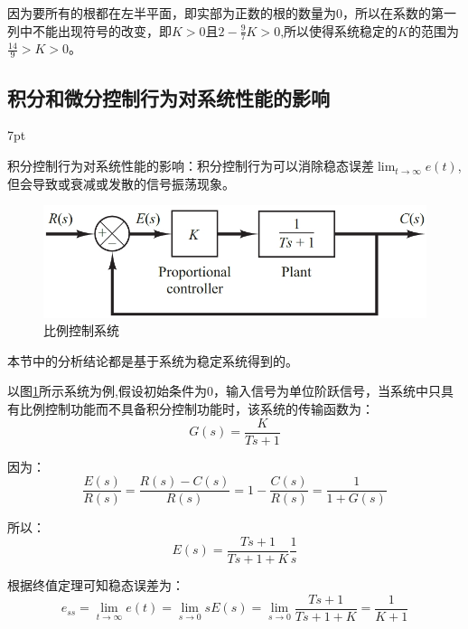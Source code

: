 \documentclass{article}
\numberwithin{equation}{section}
\numberwithin{figure}{section}
\newenvironment{formal}{%
\def\FrameCommand{%
\hspace{1pt}%
{\color{DarkBlue}\vrule width 2pt}%
{\color{formalshade}\vrule width 4pt}%
\colorbox{formalshade}%
}%
\MakeFramed{\advance\hsize-\width\FrameRestore}%
\noindent\hspace{-4.55pt}%
\begin{adjustwidth}{}{7pt}%
\vspace{2pt}\vspace{2pt}%
}
{%
\vspace{2pt}\end{adjustwidth}\endMakeFramed%
}
\begin{document}
因为要所有的根都在左半平面，即实部为正数的根的数量为0，所以在系数的第一列中不能出现符号的改变，即$K>0$且$2-\frac{9}{7}K>0$,所以使得系统稳定的$K$的范围为$\frac{14}{9}>K>0$。

\subsection{积分和微分控制行为对系统性能的影响}
\begin{formal}
    积分控制行为对系统性能的影响：积分控制行为可以消除稳态误差$\lim_{t\rightarrow \infty}e(t)$,但会导致或衰减或发散的信号振荡现象。
\end{formal}

\begin{figure}
    \centering
    \includegraphics[width=.6\textwidth]{Chapter5/ProportionalControlSystem.png} %
    \caption{比例控制系统} %
    \label{ProportionalControlSystem} %
\end{figure}

本节中的分析结论都是基于系统为稳定系统得到的。

以图\ref{ProportionalControlSystem}所示系统为例,假设初始条件为0，输入信号为单位阶跃信号，当系统中只具有比例控制功能而不具备积分控制功能时，该系统的传输函数为：
\begin{equation}
    G(s)=\frac{K}{Ts+1}
\end{equation}

因为：
\begin{equation}
    \frac{E(s)}{R(s)}=\frac{R(s)-C(s)}{R(s)}=1-\frac{C(s)}{R(s)}=\frac{1}{1+G(s)}
\end{equation}

所以：
\begin{equation}
    E(s)=\frac{Ts+1}{Ts+1+K}\frac{1}{s}
\end{equation}

根据终值定理可知稳态误差为：
\begin{equation}
    e_{ss}=\lim_{t\rightarrow \infty}e(t)=\lim_{s\rightarrow 0}sE(s)=\lim_{s\rightarrow 0}\frac{Ts+1}{Ts+1+K}=\frac{1}{K+1}
\end{equation}
\end{document}

